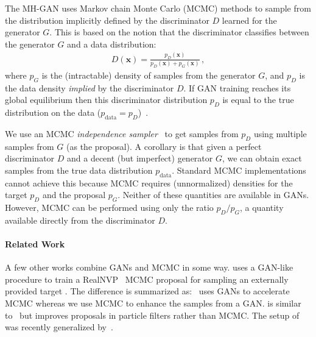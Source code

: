 \documentclass{article}
\renewcommand{\vec}[1]{{\boldsymbol{\mathbf{#1}}}} %
\newcommand{\target}{{p^\star}}
\newcommand{\PG}{{p_G}}
\newcommand{\PD}{{p_D}}
\newcommand{\PR}{{p_{\textrm{data}}}}
\begin{document}
The MH-GAN uses Markov chain Monte Carlo (MCMC) methods to sample from the distribution implicitly defined by the discriminator $D$ learned for the generator $G$.
This is based on the notion that the discriminator classifies between the generator $G$ and a data distribution:
\begin{align}
  D(\vec x) = \frac{\PD(\vec x)}{\PD(\vec x) + \PG(\vec x)}\,, \label{eq:define PD}
\end{align}
where $\PG$ is the (intractable) density of samples from the generator $G$, and $\PD$ is the data density \emph{implied} by the discriminator $D$.
If GAN training reaches its global equilibrium then this discriminator distribution $\PD$ is equal to the true distribution on the data ($\PR = \PD$)~\citep{Goodfellow2014}.

We use an MCMC \emph{independence sampler}~\citep{Tierney1994} to get samples from $\PD$ using multiple samples from $G$ (as the proposal)\@.
A corollary is that given a perfect discriminator $D$ and a decent (but imperfect) generator $G$, we can obtain exact samples from the true data distribution $\PR$.
Standard MCMC implementations cannot achieve this because MCMC requires (unnormalized) densities for the target $\PD$ and the proposal $\PG$.
Neither of these quantities are available in GANs.
However, MCMC can be performed using only the ratio $\PD / \PG$, a quantity available directly from the discriminator $D$.

\paragraph{Related Work}
A few other works combine GANs and MCMC in some way.
\citet{Song2017} uses a GAN-like procedure to train a RealNVP~\citep{Dinh2016} MCMC proposal for sampling an externally provided target \smash{$\target$}.
The difference is summarized as:~\citet{Song2017} uses GANs to accelerate MCMC whereas we use MCMC to enhance the samples from a GAN\@.
\citet{Kempinska2017} is similar to~\citet{Song2017} but improves proposals in particle filters rather than MCMC\@.
The setup of~\citet{Song2017} was recently generalized by~\citet{Neklyudov2018}.
\end{document}
